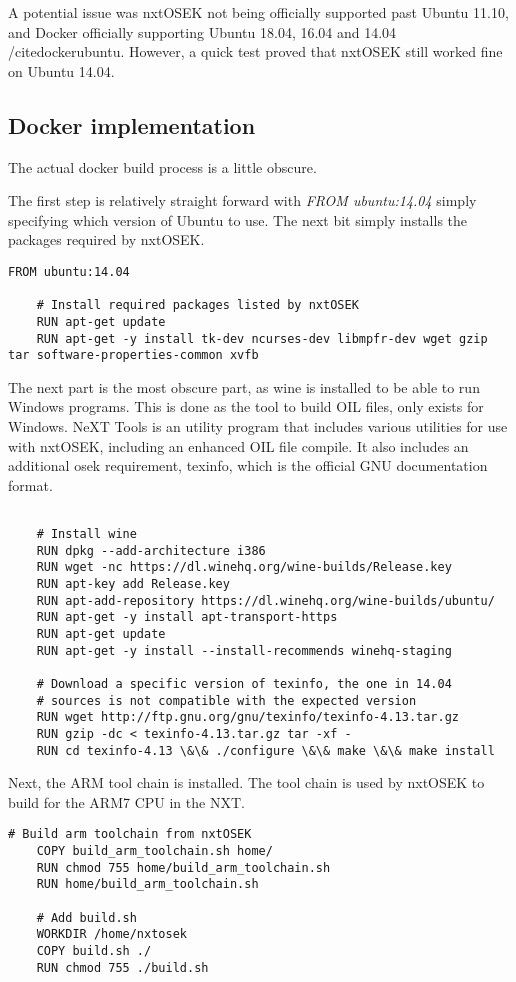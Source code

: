 A potential issue was nxtOSEK not being officially supported past Ubuntu 11.10, and Docker officially supporting Ubuntu 18.04, 16.04 and 14.04 /cite{dockerubuntu}.
However, a quick test proved that nxtOSEK still worked fine on Ubuntu 14.04.

\subsection{Docker implementation}\label{subsec:dockerimplementation}
The actual docker build process is a little obscure.

The first step is relatively straight forward with \textit{FROM ubuntu:14.04} simply specifying which version of Ubuntu to use.
The next bit simply installs the packages required by nxtOSEK.
\begin{lstlisting}[language=docker,label={lst:dockerimplementation1},caption={Version definition and installation of packages required by nxtOSEK}]
    FROM ubuntu:14.04

    # Install required packages listed by nxtOSEK
    RUN apt-get update
    RUN apt-get -y install tk-dev ncurses-dev libmpfr-dev wget gzip tar software-properties-common xvfb
\end{lstlisting} 

The next part is the most obscure part, as wine is installed to be able to run Windows programs.
This is done as the tool to build OIL files, only exists for Windows.
NeXT Tools is an utility program that includes various utilities for use with nxtOSEK, including an enhanced OIL file compile\cite{nxttool}.
It also includes an additional osek requirement, texinfo, which is the official GNU documentation format\cite{texinfo}.

\begin{lstlisting}[language=docker,label={lst:dockerimplementation2},caption={Reee}]

    # Install wine
    RUN dpkg --add-architecture i386
    RUN wget -nc https://dl.winehq.org/wine-builds/Release.key
    RUN apt-key add Release.key
    RUN apt-add-repository https://dl.winehq.org/wine-builds/ubuntu/
    RUN apt-get -y install apt-transport-https
    RUN apt-get update
    RUN apt-get -y install --install-recommends winehq-staging
    
    # Download a specific version of texinfo, the one in 14.04 
    # sources is not compatible with the expected version
    RUN wget http://ftp.gnu.org/gnu/texinfo/texinfo-4.13.tar.gz
    RUN gzip -dc < texinfo-4.13.tar.gz tar -xf -
    RUN cd texinfo-4.13 \&\& ./configure \&\& make \&\& make install
\end{lstlisting} 
Next, the ARM tool chain is installed.
The tool chain is used by nxtOSEK to build for the ARM7 CPU in the NXT.
\begin{lstlisting}[language=docker,label={lst:dockerimplementation3},caption={Reee}]
    # Build arm toolchain from nxtOSEK
    COPY build_arm_toolchain.sh home/
    RUN chmod 755 home/build_arm_toolchain.sh
    RUN home/build_arm_toolchain.sh
    
    # Add build.sh
    WORKDIR /home/nxtosek
    COPY build.sh ./
    RUN chmod 755 ./build.sh
\end{lstlisting}

